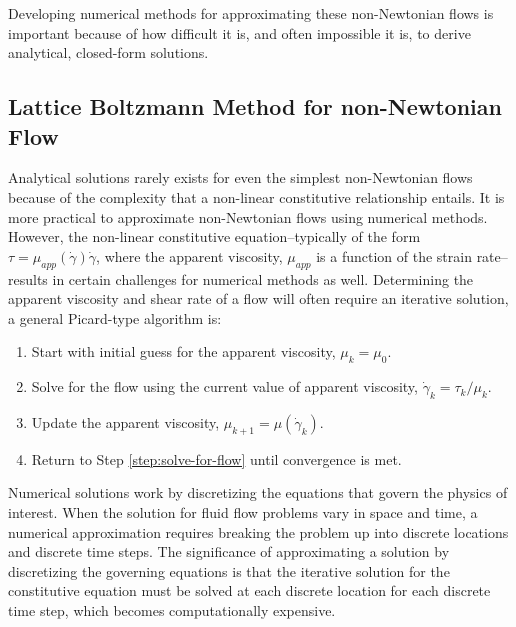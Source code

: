 \documentclass{article}
\begin{document}
Developing numerical methods for approximating these non-Newtonian flows is important because of how difficult it is, and often impossible it is, to derive analytical, closed-form solutions.

\subsection{Lattice Boltzmann Method for non-Newtonian Flow} %

Analytical solutions rarely exists for even the simplest non-Newtonian flows because of the complexity that a non-linear constitutive relationship entails.
It is more practical to approximate non-Newtonian flows using numerical methods.
However, the non-linear constitutive equation--typically of the form $\tau = \mu_{app}(\dot{\gamma}) \dot{\gamma}$, where the apparent viscosity, $\mu_{app}$ is a function of the strain rate--results in certain challenges for numerical methods as well.
Determining the apparent viscosity and shear rate of a flow will often require an iterative solution, a general Picard-type algorithm is:

\begin{enumerate}
	\item Start with initial guess for the apparent viscosity, $\mu_k = \mu_0$.
	\item \label{step:solve-for-flow} Solve for the flow using the current value of apparent viscosity, $\dot{\gamma}_k = \tau_k / \mu_k$.
	\item Update the apparent viscosity, $\mu_{k+1} = \mu(\dot{\gamma}_k)$.
	\item Return to Step \ref{step:solve-for-flow} until convergence is met.
\end{enumerate}

Numerical solutions work by discretizing the equations that govern the physics of interest.
When the solution for fluid flow problems vary in space and time, a numerical approximation requires breaking the problem up into discrete locations and discrete time steps.
The significance of approximating a solution by discretizing the governing equations is that the iterative solution for the constitutive equation must be solved at each discrete location for each discrete time step, which becomes computationally expensive.
\end{document}
